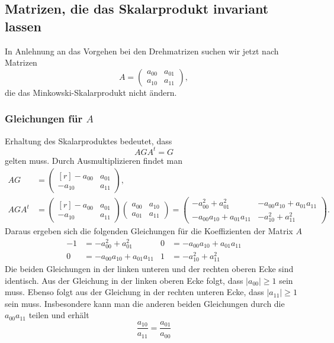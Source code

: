 %
%
\subsection{Matrizen, die das Skalarprodukt invariant lassen}
In Anlehnung an das Vorgehen bei den Drehmatrizen suchen wir jetzt nach
Matrizen
\[
A
=
\begin{pmatrix}
a_{00}&a_{01}\\
a_{10}&a_{11}
\end{pmatrix}
,
\]
die das Minkowski-Skalarprodukt nicht ändern.

\subsubsection{Gleichungen für $A$}
Erhaltung des Skalarproduktes bedeutet, dass 
\[
AGA^t = G
\]
gelten muss.
Durch Ausmultiplizieren findet man
\begin{align*}
AG&=
\begin{pmatrix*}[r]
-a_{00}& a_{01}\\
-a_{10}& a_{11}
\end{pmatrix*},
\\
AGA^t
&=
\begin{pmatrix*}[r]
-a_{00}& a_{01}\\
-a_{10}& a_{11}
\end{pmatrix*}
\begin{pmatrix}
a_{00}&a_{10}\\
a_{01}&a_{11}
\end{pmatrix}
=
\begin{pmatrix}
-a_{00}^2+a_{01}^2 & -a_{00}a_{10} +a_{01}a_{11} \\
-a_{00}a_{10} +a_{01}a_{11} & -a_{10}^2+a_{11}^2
\end{pmatrix}.
\end{align*}
Daraus ergeben sich die folgenden Gleichungen für die Koeffizienten
der Matrix $A$
\begin{align*}
-1 &= -a_{00}^2+a_{01}^2          & 0 &= -a_{00}a_{10} +a_{01}a_{11} \\
 0 &= -a_{00}a_{10} +a_{01}a_{11} & 1 &= -a_{10}^2+a_{11}^2
\end{align*}
Die beiden Gleichungen in der linken unteren und der rechten oberen Ecke
sind identisch.
Aus der Gleichung in der linken oberen Ecke folgt, dass $|a_{00}|\ge 1$
sein muss.
Ebenso folgt aus der Gleichung in der rechten unteren Ecke, dass
$|a_{11}| \ge 1$ sein muss.
Insbesondere kann man die anderen beiden Gleichungen durch die 
$a_{00}a_{11}$ teilen und erhält
\begin{equation}
\frac{a_{10}}{a_{11}} = \frac{a_{01}}{a_{00}}
\label{buch:geometrie:hyperbolisch:eqn:aaaa}
\end{equation}

